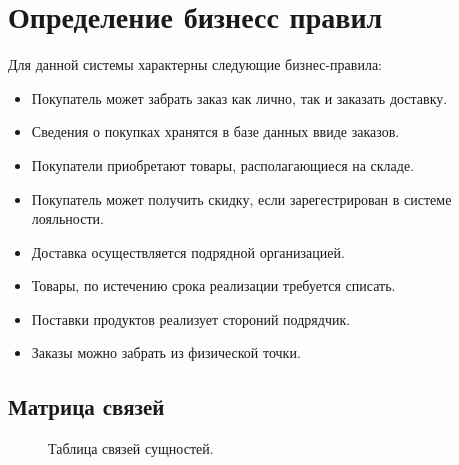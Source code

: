 \documentclass[14pt]{extreport}
\begin{document}
    \section{Определение бизнесс правил}

    Для данной системы характерны следующие бизнес-правила:
    \begin{itemize}
        \item Покупатель может забрать заказ как лично, так и заказать доставку.
        \item Сведения о покупках хранятся в базе данных ввиде заказов.
        \item Покупатели приобретают товары, располагающиеся на складе.
        \item Покупатель может получить скидку, если зарегестрирован в системе лояльности.
        \item Доставка осуществляется подрядной организацией.
        \item Товары, по истечению срока реализации требуется списать.
        \item Поставки продуктов реализует стороний подрядчик.
        \item Заказы можно забрать из физической точки.
    \end{itemize}
    
    \begin{landscape}
        
    
    \section{Матрица связей}
    
    \begin{figure}[H]%
        \centering
        \caption{Таблица связей сущностей.}
        \label{pic1} 
       \end{figure}
    \end{landscape}
\end{document}
